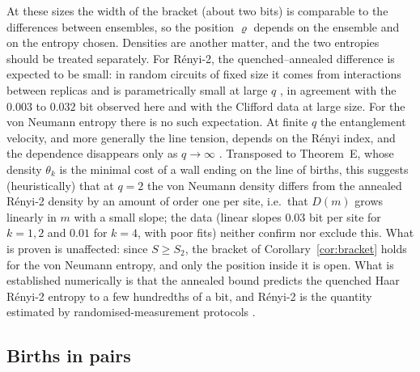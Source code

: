 At these sizes the width of the bracket (about two bits) is comparable to the differences between ensembles, so the position $\varrho$ depends on the ensemble and on the entropy chosen. Densities are another matter, and the two entropies should be treated separately. For R\'enyi-2, the quenched--annealed difference is expected to be small: in random circuits of fixed size it comes from interactions between replicas and is parametrically small at large $q$ \cite{ZhouNahum2019}, in agreement with the $0.003$ to $0.032$ bit observed here and with the Clifford data at large size. For the von Neumann entropy there is no such expectation. At finite $q$ the entanglement velocity, and more generally the line tension, depends on the R\'enyi index, and the dependence disappears only as $q\to\infty$ \cite{ZhouNahum2019}. Transposed to Theorem~E, whose density $\theta_k$ is the minimal cost of a wall ending on the line of births, this suggests (heuristically) that at $q=2$ the von Neumann density differs from the annealed R\'enyi-2 density by an amount of order one per site, i.e.\ that $D(m)$ grows linearly in $m$ with a small slope; the data (linear slopes $0.03$ bit per site for $k=1,2$ and $0.01$ for $k=4$, with poor fits) neither confirm nor exclude this. What is proven is unaffected: since $S\ge S_2$, the bracket of Corollary~\ref{cor:bracket} holds for the von Neumann entropy, and only the position inside it is open. What is established numerically is that the annealed bound predicts the quenched Haar R\'enyi-2 entropy to a few hundredths of a bit, and R\'enyi-2 is the quantity estimated by randomised-measurement protocols \cite{Brydges2019}.

\subsection{Births in pairs}\label{sec:num-pairs}

